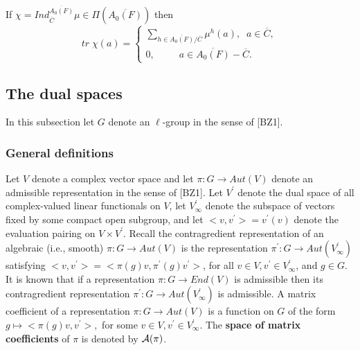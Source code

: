 \begin{corollary}
If $\chi =Ind_{\overline{C}}^{\overline{A_0(F)}}\mu \in \Pi (\overline{A_0(F)%
})$ then 
\[
tr\;\chi (a)=\left\{ 
\begin{array}{c}
\sum_{h\in \overline{A_0(F)}/\overline{C}}\mu ^h(a),\;\;a\in \overline{C},
\\ 
0,\;\;\;\;\;\;\;\;\;a\in \overline{A_0(F)}-\overline{C}.
\end{array}
\right. 
\]
\end{corollary}

\subsection{The dual spaces}

In this subsection let $G$ denote an $\ell $-group in the sense of [BZ1].

\subsubsection{General definitions}

Let $V$ denote a complex vector space and let $\pi :G\rightarrow Aut(V)$
denote an admissible representation in the sense of [BZ1]. Let $V^{\prime }$
denote the dual space of all complex-valued linear functionals on $V$, let $%
V_\infty ^{\prime }$ denote the subspace of vectors fixed by some compact
open subgroup, and let $<v,v^{\prime }>=v^{\prime }(v)$ denote the
evaluation pairing on $V\times V^{\prime }$. Recall the contragredient
representation of an algebraic (i.e., smooth) $\pi :G\rightarrow Aut(V)$ is
the representation $\pi ^{\prime }:G\rightarrow Aut(V_\infty ^{\prime })$
satisfying $<v,v^{\prime }>=<\pi (g)v,\pi ^{\prime }(g)v^{\prime }>$, for
all $v\in V,v^{\prime }\in V_\infty ^{\prime }$, and $g\in G.$ It is known
that if a representation $\pi :G\rightarrow End(V)$ is admissible then its
contragredient representation $\pi ^{\prime }:G\rightarrow Aut(V_\infty
^{\prime })$ is admissible. A matrix coefficient of a representation $\pi
:G\rightarrow Aut(V)$ is a function on $G$ of the form $g\longmapsto <\pi
(g)v,v^{\prime }>,$ for some $v\in V,v^{\prime }\in V_\infty ^{\prime }.$
The {\bf space of matrix coefficients} of $\pi $ is denoted by ${\cal A}(\pi
)$.

